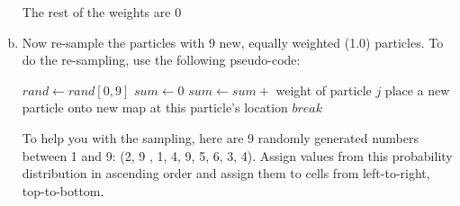 \documentclass[12pt]{article}
\begin{document}
\begin{enumerate}[a)]
\begin{center}
\end{center}
The rest of the weights are $0$


\item Now re-sample the particles with 9 new, equally weighted (1.0)
  particles.  To do the re-sampling, use the following
  pseudo-code:

   \begin{algorithmic}
      \STATE $rand \leftarrow rand[0,9]$
      \STATE $sum \leftarrow  0$
         \STATE $sum \leftarrow sum + $ weight of particle $j$
            \STATE place a new particle onto new map at this particle's location
            \STATE $break$
         \ENDIF
      \ENDFOR
   \ENDFOR
   \end{algorithmic}

   To help you with the sampling, here are 9 randomly generated
   numbers between 1 and 9: (2, 9 , 1, 4, 9, 5, 6, 3, 4). Assign
   values from this probability distribution in ascending order and
   assign them to cells from left-to-right, top-to-bottom.

\begin{center}
\end{center}


\end{enumerate}
\end{document}

